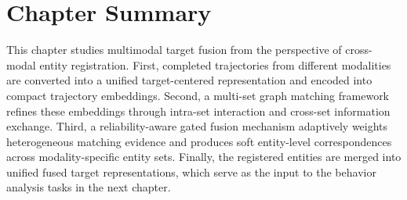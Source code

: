 \section{Chapter Summary}
This chapter studies multimodal target fusion from the perspective of cross-modal entity registration. First, completed trajectories from different modalities are converted into a unified target-centered representation and encoded into compact trajectory embeddings. Second, a multi-set graph matching framework refines these embeddings through intra-set interaction and cross-set information exchange. Third, a reliability-aware gated fusion mechanism adaptively weights heterogeneous matching evidence and produces soft entity-level correspondences across modality-specific entity sets. Finally, the registered entities are merged into unified fused target representations, which serve as the input to the behavior analysis tasks in the next chapter.
